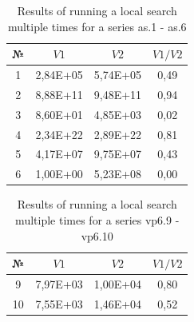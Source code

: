 \documentclass{ifacconf}
\begin{document}
\begin{table}[ht]
	\centering
	\begin{tabular}{|c|c|c|c|}
		\hline
		\hspace*{0.1cm}№\hspace*{0.1cm} &
		\hspace*{0.1cm}$V1$\hspace*{0.1cm}&
		\hspace*{0.1cm}$V2$\hspace*{0.1cm}&
		\hspace*{0.1cm}$V1/V2$\hspace*{0.1cm}\\
		\hline
		1 &  2,84E+05  &  5,74E+05 &   0,49\\
		2 &  8,88E+11  &  9,48E+11 &   0,94\\
		3 &  8,60E+01  &  4,85E+03 &   0,02\\
		4 &  2,34E+22  &  2,89E+22 &   0,81\\
		5 &  4,17E+07  &  9,75E+07 &   0,43\\
		6 &  1,00E+00  &  5,23E+08 &   0,00\\
		\hline
	\end{tabular}
	\caption{Results of running a local search multiple times for a series as.1 - as.6}	\label{spher_as}
\end{table}
\begin{table}[ht]
	\centering
	\begin{tabular}{|c|c|c|c|}
		\hline
		\hspace*{0.1cm}№\hspace*{0.1cm} &
		\hspace*{0.1cm}$V1$\hspace*{0.1cm}&
		\hspace*{0.1cm}$V2$\hspace*{0.1cm}&
		\hspace*{0.1cm}$V1/V2$\hspace*{0.1cm}\\
		\hline
		9  & 7,97E+03  &  1,00E+04  &  0,80\\
		10 & 7,55E+03  &  1,46E+04  &  0,52\\
		\hline
	\end{tabular}
	\caption{Results of running a local search multiple times for a series vp6.9 - vp6.10}	\label{spher_vp6}
\end{table}
\end{document}
